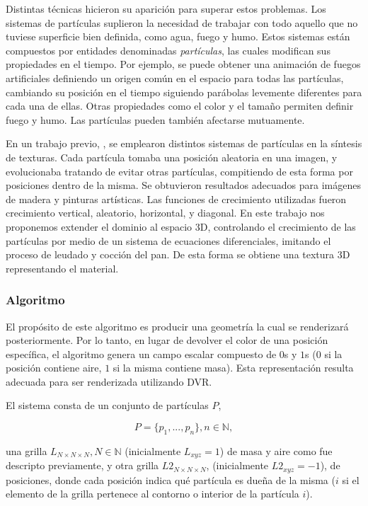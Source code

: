 \documentclass[oneside,a4paper,spanish,links]{amca}
\begin{document}
Distintas t\'ecnicas hicieron su aparici\'on para superar estos problemas. Los sistemas de part\'iculas \citep{Reeves83} suplieron la necesidad de trabajar con todo aquello que no tuviese superficie bien definida, como agua, fuego y humo. Estos sistemas est\'an compuestos por entidades denominadas {\em part\'iculas}, las cuales modifican sus propiedades en el tiempo. Por ejemplo, se puede obtener una animaci\'on de fuegos artificiales definiendo un origen com\'un en el espacio para todas las part\'iculas, cambiando su posici\'on en el tiempo siguiendo par\'abolas levemente diferentes para cada una de ellas. Otras propiedades como el color y el tama\~no permiten definir fuego y humo. Las part\'iculas pueden tambi\'en afectarse mutuamente.

En un trabajo previo, \citep{Baravalle2011}, se emplearon distintos sistemas de part\'iculas en la s\'intesis de texturas. Cada part\'icula tomaba una posici\'on aleatoria en una imagen, y evolucionaba tratando de evitar otras part\'iculas, compitiendo de esta forma por posiciones dentro de la misma. Se obtuvieron resultados adecuados para im\'agenes de madera y pinturas art\'isticas. Las funciones de crecimiento utilizadas fueron crecimiento vertical, aleatorio, horizontal, y diagonal. En este trabajo nos proponemos extender el dominio al espacio 3D, controlando el crecimiento de las part\'iculas por medio de un sistema de ecuaciones diferenciales, imitando el proceso de leudado y cocci\'on del pan. De esta forma se obtiene una textura 3D representando el material.


\subsubsection{Algoritmo}

El prop\'osito de este algoritmo es producir una geometr\'ia la cual se renderizar\'a posteriormente. Por lo tanto, en lugar de devolver el color de una posici\'on espec\'ifica, el algoritmo genera un campo escalar compuesto de $0$s y $1$s ($0$ si la posici\'on contiene aire, $1$ si la misma contiene masa). Esta representaci\'on resulta adecuada para ser renderizada utilizando DVR.

El sistema consta de un conjunto de part\'iculas $P$,

\begin{equation}
  P = \{p_{1}, ... , p_{n}\}, n  \in \mathbb{N},
\end{equation}

\noindent una grilla $L_{N\times N \times N}, N \in \mathbb{N} $ (inicialmente $L_{xyz}=1$) de masa y aire como fue descripto previamente, y otra grilla $L2_{N\times N \times N}$, (inicialmente $L2_{xyz}=-1$), de posiciones, donde cada posici\'on indica qu\'e part\'icula es due\~na de la misma ($i$ si el elemento de la grilla pertenece al contorno o interior de la part\'icula $i$).
\end{document}

